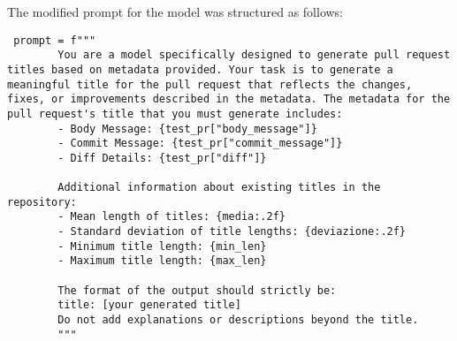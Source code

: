 The modified prompt for the model was structured as follows:
\begin{verbatim}
 prompt = f"""
        You are a model specifically designed to generate pull request titles based on metadata provided. Your task is to generate a meaningful title for the pull request that reflects the changes, fixes, or improvements described in the metadata. The metadata for the pull request's title that you must generate includes:
        - Body Message: {test_pr["body_message"]}
        - Commit Message: {test_pr["commit_message"]}
        - Diff Details: {test_pr["diff"]}
        
        Additional information about existing titles in the repository:
        - Mean length of titles: {media:.2f}
        - Standard deviation of title lengths: {deviazione:.2f}
        - Minimum title length: {min_len}
        - Maximum title length: {max_len}
        
        The format of the output should strictly be:
        title: [your generated title]
        Do not add explanations or descriptions beyond the title.
        """
\end{verbatim}
